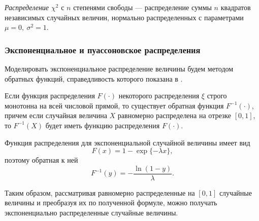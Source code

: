 \documentclass[12pt, a4paper]{article}
\begin{document}
\begin{df}
\textit{Распределение $\chi^2$} с $n$ степенями свободы --- распределение суммы $n$ квадратов независимых случайных величин, нормально распределенных с параметрами $\mu = 0,\ \sigma^2 = 1$.
\end{df}

\subsubsection{Экспоненциальное и пуассоновское распределения}
Моделировать экспоненциальное распределение величины будем методом обратных функций, справедливость которого показана в \cite{Ivchenko_Medvedev}.
\begin{stm}
Если функция распределения $F(\cdot)$ некоторого распределения $\xi$ строго монотонна на всей числовой прямой, то существует обратная функция $F^{-1}(\cdot)$, причем если случайная величина $X$ равномерно распределена на отрезке $\left[0,1\right]$, то $F^{-1}(X)$ будет иметь функцию распределения $F(\cdot)$.
\end{stm}

Функция распределения для экспоненциальной случайной величины имеет вид \[ F(x) = 1 - \exp \{-\lambda x\}, \]
поэтому обратная к ней
\[F^{-1}(y) = -\frac{\ln \left(1 - y\right)}{\lambda}.\]

Таким образом, рассматривая равномерно распределенные на $[0,1]$ случайные величины и преобразуя их по полученной формуле, можно получать экспоненциально распределенные случайные величины.
\end{document}
